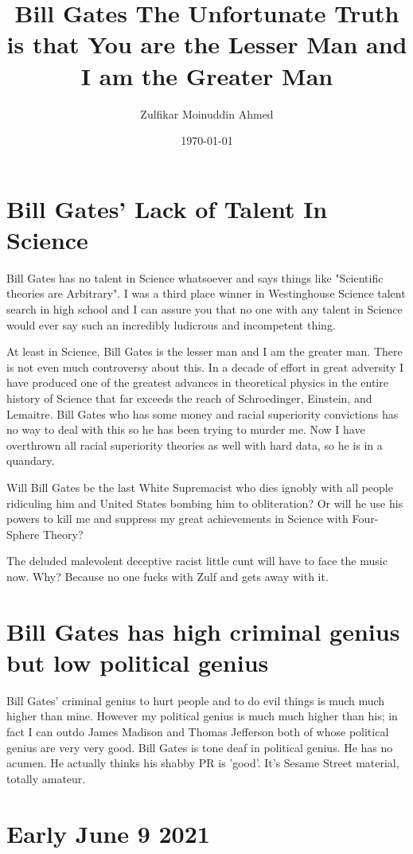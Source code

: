 \documentclass{amsart}
\title{Bill Gates The Unfortunate Truth is that You are the Lesser Man and I am the Greater Man}
\author{Zulfikar Moinuddin Ahmed}
\date{\today}
\begin{document}
\maketitle
\section{Bill Gates' Lack of Talent In Science}

Bill Gates has no talent in Science whatsoever and says things like "Scientific theories are Arbitrary".  I was a third place winner in Westinghouse Science talent search in high school and I can assure you that no one with any talent in Science would ever say such an incredibly ludicrous and incompetent thing.  

At least in Science, Bill Gates is the lesser man and I am the greater man.  There is not even much controversy about this.  In a decade of effort in great adversity I have produced one of the greatest advances in theoretical physics in the entire history of Science that far exceeds the reach of Schroedinger, Einstein, and Lemaitre.  Bill Gates who has some money and racial superiority convictions has no way to deal with this so he has been trying to murder me.  Now I have overthrown all racial superiority theories as well with hard data, so he is in a quandary.  

Will Bill Gates be the last White Supremacist who dies ignobly with all people ridiculing him and United States bombing him to obliteration?  Or will he use his powers to kill me and suppress my great achievements in Science with Four-Sphere Theory?

The deluded malevolent deceptive racist little cunt will have to face the music now.  Why?  Because no one fucks with Zulf and gets away with it.

\section{Bill Gates has high criminal genius but low political genius}

Bill Gates' criminal genius to hurt people and to do evil things is much much higher than mine.  However my political genius is much much higher than his; in fact I can outdo James Madison and Thomas Jefferson both of whose political genius are very very good.  Bill Gates is tone deaf in political genius.  He has no acumen.  He actually thinks his shabby PR is 'good'.  It's Sesame Street material, totally amateur.

\section{Early June 9 2021}
\end{document}
